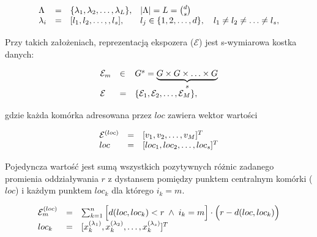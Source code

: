 \begin{equation}
	\begin{array}[b]{llll}
		\Lambda   & = & \{\lambda_1, \lambda_2, \ldots, \lambda_L \}, & \vert\Lambda\vert = L= {d \choose s}                               \\
		\lambda_i & = & [l_1, l_2, \ldots, ,l_s],                     & l_j \in \{1, 2,\ldots, d\},\quad l_1\neq l_2 \neq \ldots \neq l_s,
	\end{array}
\end{equation}

Przy takich założeniach, reprezentacją ekspozera ($\mathcal{E}$) jest s-wymiarowa kostka danych:

\begin{equation}
	\begin{array}[b]{lll}
		\mathcal{E}_m & \in & G^s = \underbrace{G \times G \times \ldots \times G}_s                                                       \\
		\mathcal{E}   & =   & \{\mathcal{E}_1, \mathcal{E}_2, \ldots, \mathcal{E}_M \},
	\end{array}
\end{equation}

\noindent gdzie każda komórka adresowana przez $loc$ zawiera wektor wartości

\begin{equation}
	\begin{array}[b]{lll}
		\mathcal{E}^{(loc)} & = & [v_1, v_2, \ldots, v_M]^T       \\
		loc                 & = & [loc_1, loc_2, \ldots, loc_s]^T
	\end{array}
\end{equation}

Pojedyncza wartość jest sumą wszystkich pozytywnych różnic zadanego promienia oddziaływania $r$ z dystansem pomiędzy punktem centralnym komórki ($loc$) i każdym punktem $loc_k$ dla którego $i_k=m$. 

\vspace{-1em}\begin{equation}
	\begin{array}[b]{lll}
		\mathcal{E}_m^{(loc)} & = & \sum_{k=1}^{n}\Big[d(loc, loc_k) < r\;\wedge\; i_k = m\Big] \cdot \Big(r-d(loc,loc_k)\Big) \\
		loc_k                 & = & [ x_k^{(\lambda_1)}, x_k^{(\lambda_2)}, \ldots, x_k^{(\lambda_s)}]^T
	\end{array}
\end{equation}

